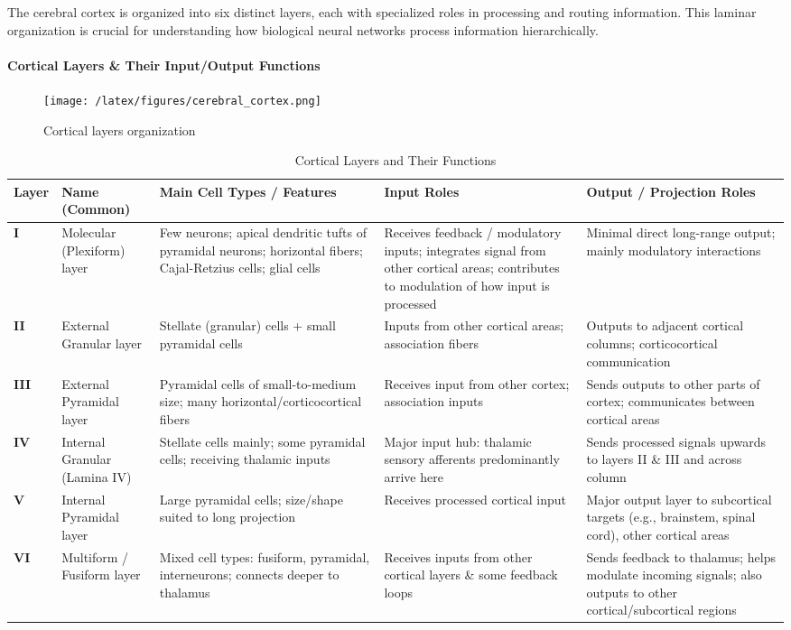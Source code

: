 The cerebral cortex is organized into six distinct layers, each with specialized roles in processing and routing information. This laminar organization is crucial for understanding how biological neural networks process information hierarchically.

\paragraph{Cortical Layers \& Their Input/Output Functions}

\begin{figure}[h!]
\centering
\texttt{[image: /latex/figures/cerebral\_cortex.png]}
\caption{Cortical layers organization}
\end{figure}

\begin{table}[h!]
\centering
\scriptsize
\begin{tabular}{|p{0.8cm}|p{2.5cm}|p{3cm}|p{3cm}|p{3.5cm}|}
\hline
\textbf{Layer} & \textbf{Name (Common)} & \textbf{Main Cell Types / Features} & \textbf{Input Roles} & \textbf{Output / Projection Roles} \\
\hline
\textbf{I} & Molecular (Plexiform) layer & Few neurons; apical dendritic tufts of pyramidal neurons; horizontal fibers; Cajal-Retzius cells; glial cells & Receives feedback / modulatory inputs; integrates signal from other cortical areas; contributes to modulation of how input is processed & Minimal direct long-range output; mainly modulatory interactions \\
\hline
\textbf{II} & External Granular layer & Stellate (granular) cells + small pyramidal cells & Inputs from other cortical areas; association fibers & Outputs to adjacent cortical columns; corticocortical communication \\
\hline
\textbf{III} & External Pyramidal layer & Pyramidal cells of small-to-medium size; many horizontal/corticocortical fibers & Receives input from other cortex; association inputs & Sends outputs to other parts of cortex; communicates between cortical areas \\
\hline
\textbf{IV} & Internal Granular (Lamina IV) & Stellate cells mainly; some pyramidal cells; receiving thalamic inputs & Major input hub: thalamic sensory afferents predominantly arrive here & Sends processed signals upwards to layers II \& III and across column \\
\hline
\textbf{V} & Internal Pyramidal layer & Large pyramidal cells; size/shape suited to long projection & Receives processed cortical input & Major output layer to subcortical targets (e.g., brainstem, spinal cord), other cortical areas \\
\hline
\textbf{VI} & Multiform / Fusiform layer & Mixed cell types: fusiform, pyramidal, interneurons; connects deeper to thalamus & Receives inputs from other cortical layers \& some feedback loops & Sends feedback to thalamus; helps modulate incoming signals; also outputs to other cortical/subcortical regions \\
\hline
\end{tabular}
\caption{Cortical Layers and Their Functions}
\end{table}

